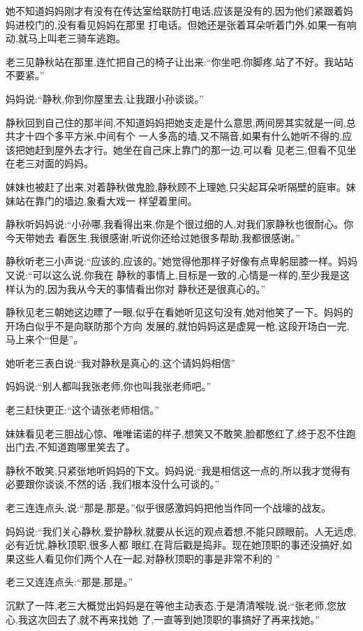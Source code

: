 ﻿\documentclass[12pt]{article}
\begin{document}
她不知道妈妈刚才有没有在传达室给联防打电话,应该是没有的,因为他们紧跟着妈妈进校门的,没有看见妈妈在那里
打电话。但她还是张着耳朵听着门外,如果一有响动,就马上叫老三骑车逃跑。
        
老三见静秋站在那里,连忙把自己的椅子让出来:``你坐吧,你脚疼,站了不好。我\myrule 站站不要紧。''

妈妈说:``静秋,你到你屋里去,让我跟小孙谈谈。''

静秋回到自己住的那半间,不知道妈妈把她支走是什么意思,两间房其实就是一间,总共才十四个多平方米,中间有个
一人多高的墙,又不隔音,如果有什么她听不得的,应该把她赶到屋外去才行。她坐在自己床上靠门的那一边,可以看
见老三,但看不见坐在老三对面的妈妈。

妹妹也被赶了出来,对着静秋做鬼脸,静秋顾不上理她,只尖起耳朵听隔壁的庭审。妹妹站在靠门的墙边,象看大戏一
样望着里间。

静秋听妈妈说:``小孙哪,我看得出来,你\myrule 是个很过细的人,对我们家静秋也很\myrule 耐心。你今天带她去
看医生,我\myrule 很感谢,听说你还给过她很多帮助,我\myrule 都很感谢。''

静秋听老三小声说:``应该的,应该的。''她觉得他那样子好像有点卑躬屈膝一样。妈妈又说:``可以这么说,你我在
静秋的事情上,目标是一致的,心情是一样的,至少我是这样认为的,因为我\myrule 从今天的事情看出你\myrule 对
静秋还是很\myrule 真心的。''

静秋见老三朝她这边瞟了一眼,似乎在看她听见这句没有,她对他笑了一下。妈妈的开场白似乎不是向联防那个方向
发展的,就怕妈妈这是虚晃一枪,这段开场白一完,马上来个``但是''。

她听老三表白说:``我对静秋是真心的,这个请妈妈相信\myrule ''

妈妈说:``别人都叫我张老师,你也叫我张老师吧。''

老三赶快更正:``这个请张老师相信。''

妹妹看见老三胆战心惊、唯唯诺诺的样子,想笑又不敢笑,脸都憋红了,终于忍不住跑出门去,不知道跑哪里笑去了。

静秋不敢笑,只紧张地听妈妈的下文。妈妈说:``我是相信这一点的,所以我才觉得有必要跟你谈谈,不然的话
\myrule ,我们根本没什么可谈的。''

老三连连点头,说:``那是,那是。''似乎很感激妈妈把他当作同一个战壕的战友。

妈妈说:``我们关心静秋,爱护静秋,就要从长远的观点着想,不能只顾眼前。人无远虑,必有近忧,静秋顶职,很多人都
眼红,在背后戳是捣非。现在她顶职的事还没搞好,如果这些人看见你们两个人在一起,对静秋顶职的事是非常不利的
\myrule ''

老三又连连点头:``那是,那是。''

沉默了一阵,老三大概觉出妈妈是在等他主动表态,于是清清喉咙,说:``张老师,您放心,我这次回去了,就不再来找她
了,一直等到她顶职的事搞好了再来找她。''
\end{document}
